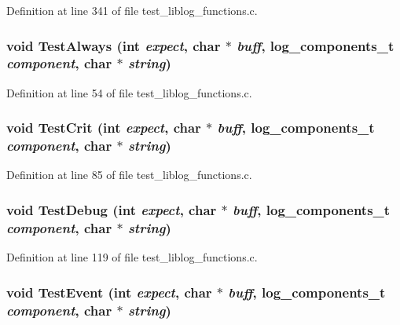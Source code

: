 Definition at line 341 of file test\_\-liblog\_\-functions.c.
\subsubsection[{TestAlways}]{\setlength{\rightskip}{0pt plus 5cm}void TestAlways (int {\em expect}, \/  char $\ast$ {\em buff}, \/  log\_\-components\_\-t {\em component}, \/  char $\ast$ {\em string})}\label{test__liblog__functions_8c_aa6a32605a698b5f5d13df70c016c7e62}


Definition at line 54 of file test\_\-liblog\_\-functions.c.
\subsubsection[{TestCrit}]{\setlength{\rightskip}{0pt plus 5cm}void TestCrit (int {\em expect}, \/  char $\ast$ {\em buff}, \/  log\_\-components\_\-t {\em component}, \/  char $\ast$ {\em string})}\label{test__liblog__functions_8c_a21ce3be0586aa82e97f15b36a447e90a}


Definition at line 85 of file test\_\-liblog\_\-functions.c.
\subsubsection[{TestDebug}]{\setlength{\rightskip}{0pt plus 5cm}void TestDebug (int {\em expect}, \/  char $\ast$ {\em buff}, \/  log\_\-components\_\-t {\em component}, \/  char $\ast$ {\em string})}\label{test__liblog__functions_8c_a7d1ffd25b60254daea9f0fbd8a2a650b}


Definition at line 119 of file test\_\-liblog\_\-functions.c.
\subsubsection[{TestEvent}]{\setlength{\rightskip}{0pt plus 5cm}void TestEvent (int {\em expect}, \/  char $\ast$ {\em buff}, \/  log\_\-components\_\-t {\em component}, \/  char $\ast$ {\em string})}\label{test__liblog__functions_8c_a7b0b64d1379d9e1a28cf2a8569a2591f}


